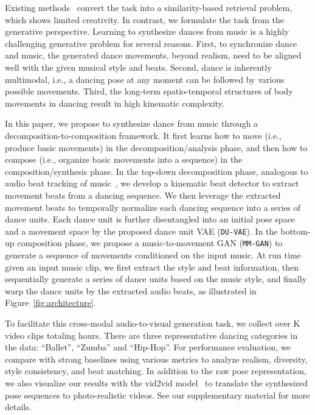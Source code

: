 \documentclass{article}
\begin{document}
Existing methods~\cite{fan2012example,lee2013music,ofli2012learn2dance} convert the task into a similarity-based retrieval problem, which shows limited creativity.
In contrast, we formulate the task from the generative perspective. 
Learning to synthesize dances from music is a highly challenging generative problem for several reasons. 
First, to synchronize dance and music, the generated dance movements, beyond realism, need to be aligned well with the given musical style and beats.
Second, dance is inherently multimodal, i.e., a dancing pose at any moment can be followed by various possible movements.
Third, the long-term spatio-temporal structures of body movements in dancing result in high kinematic complexity. 



In this paper, we propose 
to synthesize dance from music through a decomposition-to-composition framework. 
It first learns how to move (i.e., produce basic movements) in the decomposition/analysis phase, and then how to compose (i.e., organize basic movements into a sequence) in the composition/synthesis phase.  
In the top-down decomposition phase, analogous to audio beat tracking of music~\cite{ellis2007beat}, we develop a kinematic beat detector to extract movement beats from a dancing sequence.
We then leverage the extracted movement beats to temporally normalize each dancing sequence into a series of dance units.
Each dance unit is further disentangled into an initial pose space and a movement space by the proposed dance unit VAE (\texttt{DU-VAE}). 
In the bottom-up composition phase, we propose a music-to-movement GAN (\texttt{MM-GAN}) to generate a sequence of movements conditioned on the input music. 
At run time given an input music clip, we first extract the style and beat information, 
then sequentially generate a series of dance units based on the music style, and finally warp the dance units by the extracted audio beats, as illustrated in Figure~\ref{fig:architecture}.
 
To facilitate this cross-modal audio-to-visual generation task, we collect over K video clips totaling  hours. 
There are three representative dancing categories in the data: ``Ballet'', ``Zumba'' and ``Hip-Hop''. 
For performance evaluation, we compare with strong baselines using various metrics to analyze realism, diversity, style consistency, and beat matching.
In addition to the raw pose representation, we also visualize our results with the vid2vid model~\cite{wang2018vid2vid} to translate the synthesized pose sequences to photo-realistic videos. See our supplementary material for more details.
\end{document}
